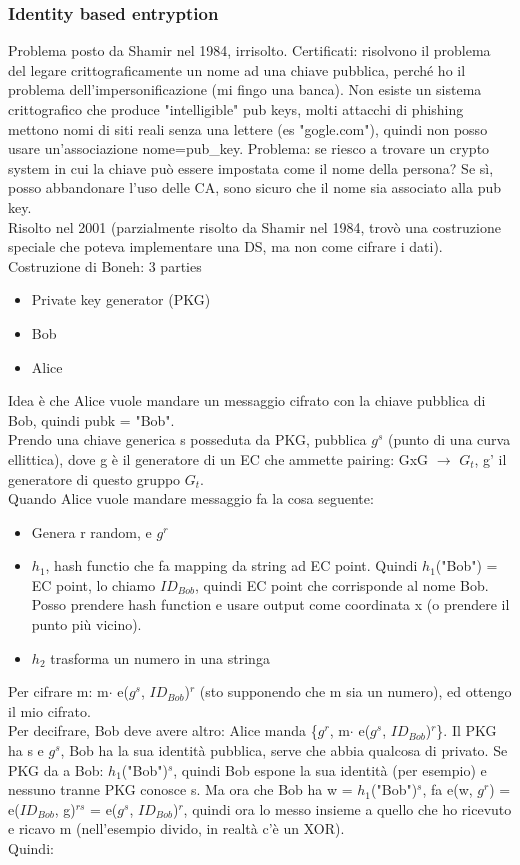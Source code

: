 \documentclass[16px]{article}
\begin{document}
\subsubsection{Identity based entryption}
Problema posto da Shamir nel 1984, irrisolto. Certificati: risolvono il problema del legare crittograficamente un nome ad una chiave pubblica, perché ho il problema dell'impersonificazione (mi fingo una banca). Non esiste un sistema crittografico che produce "intelligible" pub keys, molti attacchi di phishing mettono nomi di siti reali senza una lettere (es "gogle.com"), quindi non posso usare un'associazione nome=pub\_key. Problema: se riesco a trovare un crypto system in cui la chiave può essere impostata come il nome della persona? Se sì, posso abbandonare l'uso delle CA, sono sicuro che il nome sia associato alla pub key.\\ Risolto nel 2001 (parzialmente risolto da Shamir nel 1984, trovò una costruzione speciale che poteva implementare una DS, ma non come cifrare i dati).\\ Costruzione di Boneh: 3 parties
\begin{itemize}
\item Private key generator (PKG)
\item Bob
\item Alice
\end{itemize}
Idea è che Alice vuole mandare un messaggio cifrato con la chiave pubblica di Bob, quindi pubk = "Bob".\\ Prendo una chiave generica s posseduta da PKG, pubblica $g^s$ (punto di una curva ellittica), dove g è il generatore di un EC che ammette pairing: GxG $\rightarrow$ $G_t$, g' il generatore di questo gruppo $G_t$.\\ Quando Alice vuole mandare messaggio fa la cosa seguente:
\begin{itemize}
\item Genera r random, e $g^r$
\item $h_1$, hash functio che fa mapping da string ad EC point. Quindi $h_1$("Bob") = EC point, lo chiamo $	ID_{Bob}$, quindi EC point che corrisponde al nome Bob.\\ Posso prendere hash function e usare output come coordinata x (o prendere il punto più vicino).
\item $h_2$ trasforma un numero in una stringa
\end{itemize}
Per cifrare m: m$\cdot$ e($g^s$, $ID_{Bob}$)$^r$ (sto supponendo che m sia un numero), ed ottengo il mio cifrato.\\ Per decifrare, Bob deve avere altro: Alice manda \{$g^r$, m$\cdot$ e($g^s$, $ID_{Bob}$)$^r$\}. Il PKG ha s e $g^s$, Bob ha la sua identità pubblica, serve che abbia qualcosa di privato. Se PKG da a Bob: $h_1$("Bob")$^s$, quindi Bob espone la sua identità (per esempio) e nessuno tranne PKG conosce s. Ma ora che Bob ha w = $h_1$("Bob")$^s$, fa e(w, $g^r$) = e($ID_{Bob}$, g)$^{rs}$ = e($g^s$, $ID_{Bob}$)$^r$, quindi ora lo messo insieme a quello che ho ricevuto e ricavo m (nell'esempio divido, in realtà c'è un XOR).\\ Quindi:
\end{document}

